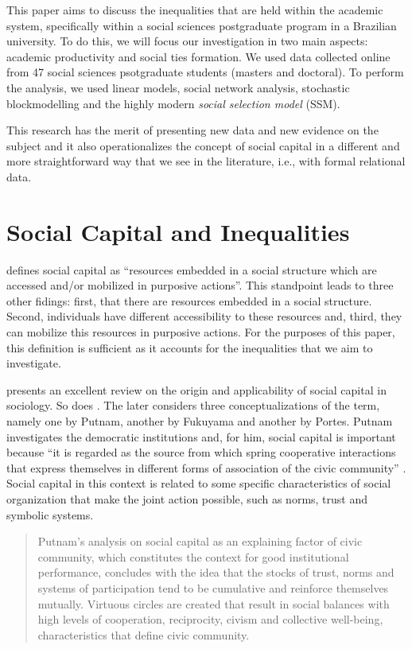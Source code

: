\documentclass[12pt, english]{article}
\begin{document}
This paper aims to discuss the inequalities that are held within the academic system, specifically within a social sciences postgraduate program in a Brazilian university. To do this, we will focus our investigation in two main aspects: academic productivity and social ties formation. We used data collected online from 47 social sciences psotgraduate students (masters and doctoral). To perform the analysis, we used linear models, social network analysis, stochastic blockmodelling and the highly modern \textit{social selection model} (SSM).

This research has the merit of presenting new data and new evidence on the subject and it also operationalizes the concept of social capital in a different and more straightforward way that we see in the literature, i.e., with formal relational data.

\section{Social Capital and Inequalities}

\cite[p. 35]{lin1999building} defines social capital as ``resources embedded in a social structure which are accessed and/or mobilized in purposive actions''. This standpoint leads to three other fidings: first, that there are resources embedded in a social structure. Second, individuals have different accessibility to these resources and, third, they can mobilize this resources in purposive actions. For the purposes of this paper, this definition is sufficient as it accounts for the inequalities that we aim to investigate.

\cite{portes1998social} presents an excellent review on the origin and applicability of social capital in sociology. So does \cite{higgins2005fundamentos}. The later considers three conceptualizations of the term, namely one by Putnam, another by Fukuyama and another by Portes. Putnam investigates the democratic institutions and, for him, social capital is important because ``it is regarded as the source from which spring cooperative interactions that express themselves in different forms of association of the civic community'' \cite[p. 63]{higgins2005fundamentos}. Social capital in this context is related to some specific characteristics of social organization that make the joint action possible, such as norms, trust and symbolic systems.



\begin{quotation}
	Putnam's analysis on social capital as an explaining factor of civic community, which constitutes the context for good institutional performance, concludes with the idea that the stocks of trust, norms and systems of participation tend to be cumulative and reinforce themselves mutually. Virtuous circles are created that result in social balances with high levels of cooperation, reciprocity, civism and collective well-being, characteristics that define civic community. \cite[p. 67]{higgins2005fundamentos}
\end{quotation}
\end{document}
